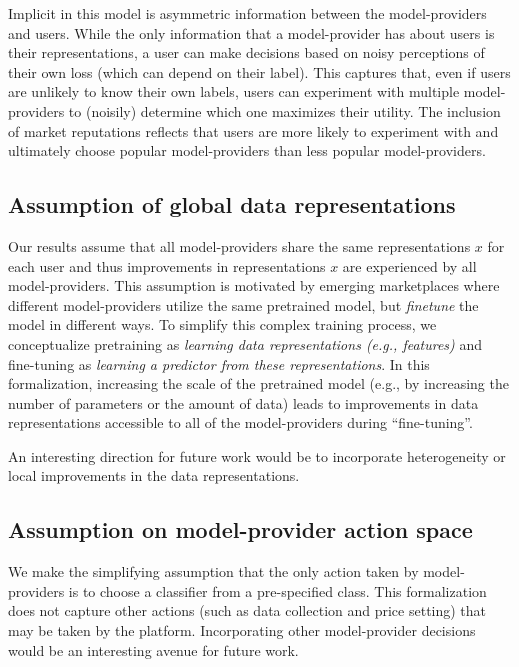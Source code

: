 \documentclass[letterpaper,11pt]{article}
\theoremstyle{plain}
\begin{document}
Implicit in this model is asymmetric information between the model-providers and users. While the only information that a model-provider has about users is their representations, a user can make decisions based on noisy perceptions of their own loss (which can depend on their label). This captures that, even if users are unlikely to know their own labels,  users can experiment with multiple model-providers to (noisily) determine which one maximizes their utility. The inclusion of market reputations reflects that users are more likely to experiment with and ultimately choose popular model-providers than less popular model-providers. 

\subsection{Assumption of global data representations}

Our results assume that all model-providers share the same representations $x$ for each user and thus improvements in representations $x$ are experienced by all model-providers. This assumption is motivated by emerging marketplaces where different model-providers utilize the same pretrained model, but \textit{finetune} the model in different ways. To simplify this complex training process, we conceptualize pretraining as \textit{learning data representations (e.g., features)} and fine-tuning as \textit{learning a predictor from these representations}. In this formalization, increasing the scale of the pretrained model (e.g., by increasing the number of parameters or the amount of data) leads to improvements in data representations accessible to all of the model-providers during ``fine-tuning''.

An interesting direction for future work would be to incorporate  heterogeneity or local improvements in the data representations.


\subsection{Assumption on model-provider action space}

We make the simplifying assumption that the only action taken by model-providers is to choose a classifier from a pre-specified class. This formalization does not capture other actions (such as data collection and price setting) that may be taken by the platform. Incorporating other model-provider decisions would be an interesting avenue for future work. 
\end{document}

